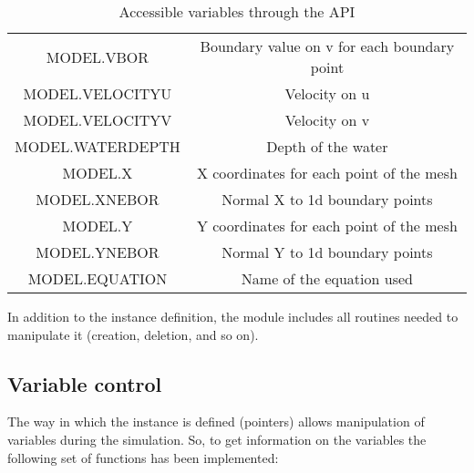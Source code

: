 \begin{table}[!H]
\begin{center}
\begin{tabular}{|cc|}
MODEL.VBOR& Boundary value on v for each boundary point\tabularnewline
MODEL.VELOCITYU& Velocity on u\tabularnewline
MODEL.VELOCITYV& Velocity on v\tabularnewline
MODEL.WATERDEPTH& Depth of the water\tabularnewline
MODEL.X& X coordinates for each point of the mesh\tabularnewline
MODEL.XNEBOR& Normal X to 1d boundary points\tabularnewline
MODEL.Y& Y coordinates for each point of the mesh\tabularnewline
MODEL.YNEBOR& Normal Y to 1d boundary points\tabularnewline
MODEL.EQUATION& Name of the equation used\tabularnewline
\hline
\end{tabular}
\caption{Accessible variables through the API\label{var_access}}
\end{center}
\end{table}

In addition to the instance definition, the module includes all routines needed
to manipulate it (creation, deletion, and so on).

\subsection{Variable control}
\label{subsec:var}
The way in which the instance is defined (pointers) allows manipulation of
variables during the simulation. So, to get information on the variables the
following set of functions has been implemented:

